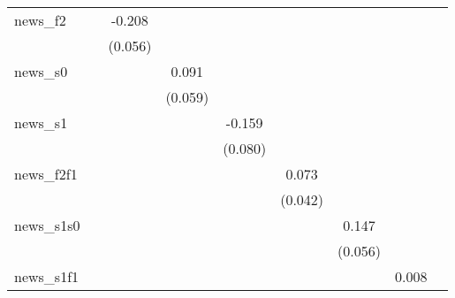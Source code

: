 {\begin{tabular}{l*{8}{c}}
news\_f2     &                     &      -0.208\sym{***}&                     &                     &                     &                     &                     &                     \\
            &                     &     (0.056)         &                     &                     &                     &                     &                     &                     \\
\addlinespace
news\_s0     &                     &                     &       0.091         &                     &                     &                     &                     &                     \\
            &                     &                     &     (0.059)         &                     &                     &                     &                     &                     \\
\addlinespace
news\_s1     &                     &                     &                     &      -0.159\sym{*}  &                     &                     &                     &                     \\
            &                     &                     &                     &     (0.080)         &                     &                     &                     &                     \\
\addlinespace
news\_f2f1   &                     &                     &                     &                     &       0.073\sym{*}  &                     &                     &                     \\
            &                     &                     &                     &                     &     (0.042)         &                     &                     &                     \\
\addlinespace
news\_s1s0   &                     &                     &                     &                     &                     &       0.147\sym{**} &                     &                     \\
            &                     &                     &                     &                     &                     &     (0.056)         &                     &                     \\
\addlinespace
news\_s1f1   &                     &                     &                     &                     &                     &                     &       0.008         &                     \\

\end{tabular}}
